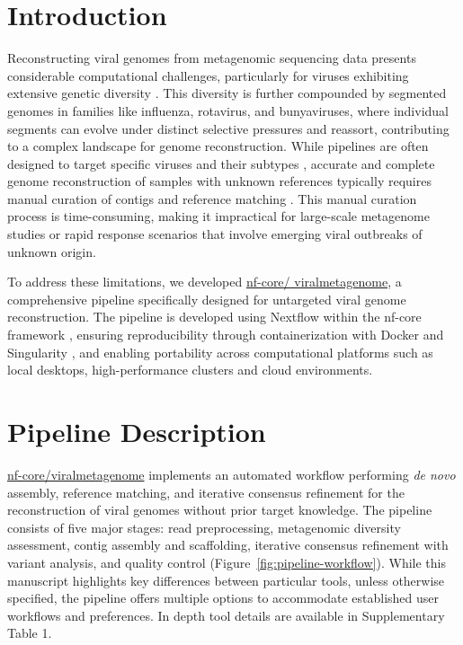 
\section{Introduction}
Reconstructing viral genomes from metagenomic sequencing data presents considerable computational challenges, particularly for viruses exhibiting extensive genetic diversity \citep{Baaijens2017-hw,Meleshko2021-gb}. This diversity is further compounded by segmented genomes in families like influenza, rotavirus, and bunyaviruses, where individual segments can evolve under distinct selective pressures and reassort, contributing to a complex landscape for genome reconstruction. While pipelines are often designed to target specific viruses and their subtypes \citep{Shepard2016-uh}, accurate and complete genome reconstruction of samples with unknown references typically requires manual curation of contigs and reference matching \citep{de_Vries2021-po}. This manual curation process is time-consuming, making it impractical for large-scale metagenome studies or rapid response scenarios that involve emerging viral outbreaks of unknown origin.

To address these limitations, we developed \href{https://github.com/nf-core/viralmetagenome}{nf-core/ viralmetagenome}, a comprehensive pipeline specifically designed for untargeted viral genome reconstruction. The pipeline is developed using Nextflow \citep{Di-Tommaso2017-nz} within the nf-core framework \citep{Ewels2020-kk}, ensuring reproducibility through containerization with Docker \citep{Merkel2014-hn} and Singularity \citep{Kurtzer2017-iw}, and enabling portability across computational platforms such as local desktops, high-performance clusters and cloud environments.

\section{Pipeline Description}

\href{https://github.com/nf-core/viralmetagenome}{nf-core/viralmetagenome} implements an automated workflow performing \textit{de novo} assembly, reference matching, and iterative consensus refinement for the reconstruction of  viral genomes without prior target knowledge. The pipeline consists of five major stages: read preprocessing, metagenomic diversity assessment, contig assembly and scaffolding, iterative consensus refinement with variant analysis, and quality control (Figure~\ref{fig:pipeline-workflow}). While this manuscript highlights key differences between particular tools, unless otherwise specified, the pipeline offers multiple options to accommodate established user workflows and preferences. In depth tool details are available in Supplementary Table 1.

